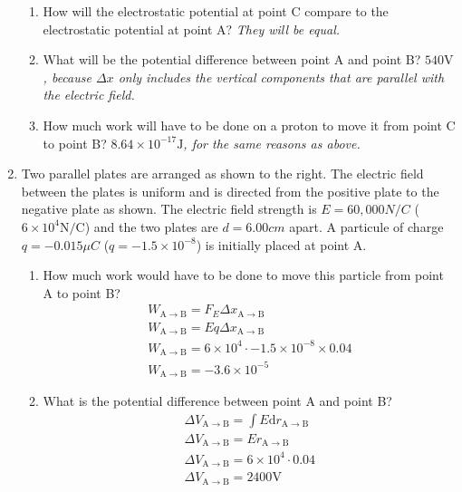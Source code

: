 \documentclass[12pt]{article}
\newcommand{\dd}[1]{\mathrm{d}#1}
\begin{document}
\begin{enumerate}
\begin{enumerate}[resume]
  \item How will the electrostatic potential at point C compare to the electrostatic potential at point A?
    \textit{They will be equal.}

  \item What will be the potential difference between point A and point B?
    \textit{$540 \mathrm{V}$, because $\Delta x$ only includes the vertical components that are parallel with the electric field.}

  \item How much work will have to be done on a proton to move it from point C to point B?
    \textit{$8.64 \times 10^{-17} \mathrm{J}$, for the same reasons as above.}
\end{enumerate}

\item Two parallel plates are arranged as shown to the right. The electric field between the plates is uniform and is directed from the positive plate to the negative plate as shown. The electric field strength is $E=60,000 N/C$ ($6 \times 10^{4} \mathrm{N/C}$) and the two plates are $d=6.00cm$ apart. A particule of charge $q=-0.015\mu C$ ($q = -1.5 \times 10^{-8}$) is initially placed at point A.
\begin{enumerate}
  \item How much work would have to be done to move this particle from point A to point B?
    \begin{align}
      W_{\mathrm{A} \to \mathrm{B}} = F_{E} \Delta x_{\mathrm{A} \to \mathrm{B}} \\
      W_{\mathrm{A} \to \mathrm{B}} = Eq \Delta x_{\mathrm{A} \to \mathrm{B}} \\
      W_{\mathrm{A} \to \mathrm{B}} = 6 \times 10^{4} \cdot -1.5 \times 10^{-8} \times 0.04 \\
      W_{\mathrm{A} \to \mathrm{B}} = -3.6 \times 10^{-5}
    \end{align}

  \item What is the potential difference between point A and point B?
    \begin{align}
      \Delta V_{\mathrm{A} \to \mathrm{B}} = \int E \dd r_{\mathrm{A} \to \mathrm{B}} \\
      \Delta V_{\mathrm{A} \to \mathrm{B}} = Er_{\mathrm{A} \to \mathrm{B}}\\
      \Delta V_{\mathrm{A} \to \mathrm{B}} = 6 \times 10^{4} \cdot 0.04 \\
      \Delta V_{\mathrm{A} \to \mathrm{B}} = 2400 \mathrm{V}
    \end{align}


\end{enumerate}
\end{enumerate}
\end{document}
